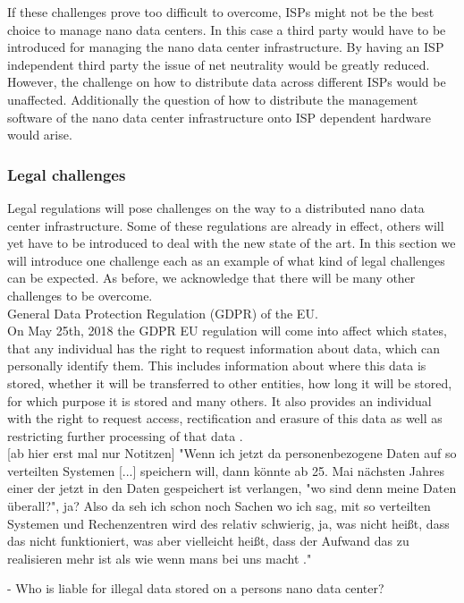 
If these challenges prove too difficult to overcome, ISPs might not be the best choice to manage nano data centers. In this case a third party would have to be introduced for managing the nano data center infrastructure. By having an ISP independent third party the issue of net neutrality would be greatly reduced. However, the challenge on how to distribute data across different ISPs would be unaffected. Additionally the question of how to distribute the management software of the nano data center infrastructure onto ISP dependent hardware would arise. 


\subsubsection{Legal challenges}
Legal regulations will pose challenges on the way to a distributed nano data center infrastructure. Some of these regulations are already in effect, others will yet have to be introduced to deal with the new state of the art. In this section we will introduce one challenge each as an example of what kind of legal challenges can be expected. As before, we acknowledge that there will be many other challenges to be overcome.\\

General Data Protection Regulation (GDPR) of the EU.\\
On May 25th, 2018 the GDPR EU regulation will come into affect which states, that any individual has the right to request information about data, which can personally identify them. This includes information about where this data is stored, whether it will be transferred to other entities, how long it will be stored, for which purpose it is stored and many others. It also provides an individual with the right to request access, rectification and erasure of this data as well as restricting further processing of that data \cite{gdpr}.\\

[ab hier erst mal nur Notitzen]
"Wenn ich jetzt da personenbezogene Daten auf so verteilten Systemen [...] speichern will, dann könnte ab 25. Mai nächsten Jahres einer der jetzt in den Daten gespeichert ist verlangen, "wo sind denn meine Daten überall?", ja? Also da seh ich schon noch Sachen wo ich sag, mit so verteilten Systemen und Rechenzentren wird des relativ schwierig, ja, was nicht heißt, dass das nicht funktioniert, was aber vielleicht heißt, dass der Aufwand das zu realisieren mehr ist als wie wenn mans bei uns macht \cite{kranzlm}."

- Who is liable for illegal data stored on a persons nano data center?

